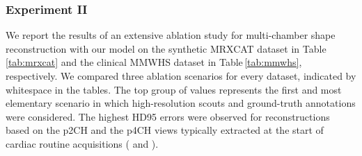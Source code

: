         \subsubsection{Experiment II}
            We report the results of an extensive ablation study for multi-chamber shape reconstruction with our model on the synthetic MRXCAT dataset in Table\,\ref{tab:mrxcat} and the clinical MMWHS dataset in Table\,\ref{tab:mmwhs}, respectively.
            We compared three ablation scenarios for every dataset, indicated by whitespace in the tables.
            The top group of values represents the first and most elementary scenario in which high-resolution scouts and ground-truth annotations were considered.
            The highest HD95 errors were observed for reconstructions based on the p2CH and the p4CH views typically extracted at the start of cardiac routine acquisitions ( and ).

